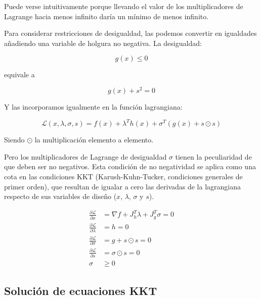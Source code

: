 Puede verse intuitivamente porque llevando el valor de los multiplicadores de
Lagrange hacia menos infinito daría un mínimo de menos infinito.

Para considerar restricciones de desigualdad, las podemos convertir en
igualdades añadiendo una variable de holgura no negativa. La desigualdad:

\begin{equation}
	g(x) \leq 0
\end{equation}

equivale a

\begin{equation}
	g(x) + s^2 = 0
\end{equation}

Y las incorporamos igualmente en la función lagrangiana:

\begin{equation}
	\mathcal{L}(x, \lambda, \sigma, s) = f(x) + \lambda^T h(x) + \sigma^T (g(x) + s \odot s)
\end{equation}

Siendo $\odot$ la multiplicación elemento a elemento.


Pero los multiplicadores de Lagrange de desigualdad $\sigma$ tienen la
peculiaridad de que deben ser no negativos. Esta condición de no negatividad se
aplica como una cota en las condiciones KKT (Karush-Kuhn-Tucker, condiciones
generales de primer orden), que resultan de igualar a cero las derivadas de la
lagrangiana respecto de sus variables de diseño ($x$, $\lambda$, $\sigma$ y
$s$).

\begin{align}
	\frac{\partial \mathcal{L}}{\partial x}       & = \nabla f + J_h^T \lambda + J_g^T \sigma = 0             \\
	\frac{\partial \mathcal{L}}{\partial \lambda} & = h = 0                                                   \\
	\frac{\partial \mathcal{L}}{\partial \sigma}  & = g + s \odot s = 0                                       \\
	\frac{\partial \mathcal{L}}{\partial s}       & = \sigma \odot s = 0   \label{eq:complementary_slackness} \\
	\sigma                                        & \geq 0
\end{align}

\subsection{Solución de ecuaciones KKT}

